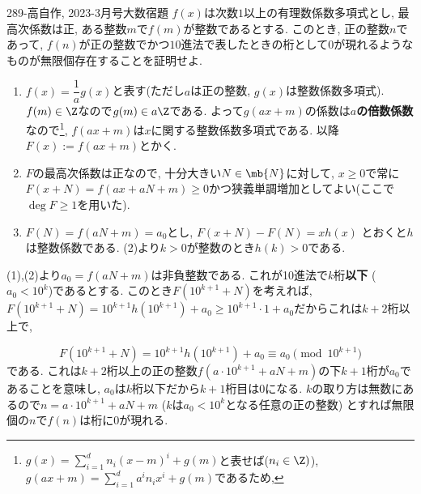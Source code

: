 \begin{thm}{289}{-高}{自作, 2023-3月号大数宿題}
$f(x)$は次数$1$以上の有理数係数多項式とし, 最高次係数は正, ある整数$m$で$f(m)$が整数であるとする. このとき, 正の整数$n$であって, $f(n)$が正の整数でかつ$10$進法で表したときの桁として$0$が現れるようなものが無限個存在することを証明せよ. 
\end{thm}

 \begin{enumerate}
        \item $f(x) = \dfrac{1}{a} g(x)$と表す(ただし$a$は正の整数, $g(x)$は整数係数多項式). $f(m)\in \Z$なので$g(m) \in a\Z$である. よって$g(ax + m)$の係数は\textbf{$a$の倍数係数}なので\footnote{$g(x) = \sum_{i=1}^{d} n_i (x-m)^{i} + g(m)$と表せば($n_i\in \Z )$), $g(ax + m) = \sum_{i=1}^{d}a^i n_i x^i+ g(m)$であるため, }, $f(ax + m)$は$x$に関する整数係数多項式である. 以降$F(x):= f(ax+m)$とかく. 
        \item $F$の最高次係数は正なので, 十分大きい$N\in\mb{N}$に対して, $x\geq 0$で常に$F(x+N) = f(ax + aN + m) \geq 0$かつ狭義単調増加としてよい(ここで$\deg{F} \geq 1$を用いた).
        \item $F(N) = f(aN + m) = a_0$とし, $F(x+N) - F(N) = xh(x)$ とおくと$h$は整数係数である. (2)より$k>0$が整数のとき$h(k) > 0$である. 

    \end{enumerate}
      (1),(2)より$a_0 = f(aN + m)$は非負整数である. これが10進法で$k$桁\textbf{以下} ($a_0 < 10^{k}$)であるとする. このとき$F(10^{k+1} + N)$を考えれば, $F(10^{k+1} + N) = 10^{k+1}h(10^{k+1}) + a_0 \geq 10^{k+1}\cdot 1 + a_0$だからこれは$k+2$桁以上で, 

 \[
 F(10^{k+1} + N) =  10^{k+1} h(10^{k+1}) + a_0 \equiv a_0 \pmod{10^{k+1}}
 \]
 である. これは$k+2$桁以上の正の整数$f(a\cdot 10^{k+1} + aN + m)$の下$k+1$桁が$a_0$であることを意味し, $a_0$は$k$桁以下だから$k+1$桁目は0になる. $k$の取り方は無数にあるので$n = a\cdot 10^{k+1} + aN + m$ ($k$は$a_0 < 10^k$となる任意の正の整数) とすれば無限個の$n$で$f(n)$は桁に0が現れる. 